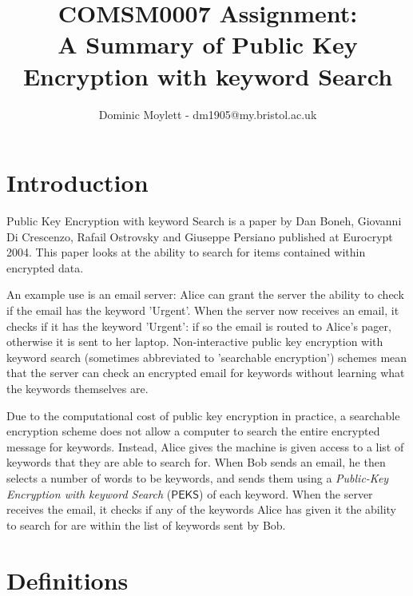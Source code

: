 \documentclass[a4paper,11pt]{article}
\title{COMSM0007 Assignment:\\A Summary of Public Key Encryption with keyword Search}
\author{Dominic Moylett - dm1905@my.bristol.ac.uk}
\begin{document}
    \maketitle

    \section{Introduction}

    Public Key Encryption with keyword Search\cite{cryptoeprint:2003:195} is a paper by Dan Boneh, Giovanni Di Crescenzo, Rafail Ostrovsky and Giuseppe Persiano published at Eurocrypt 2004. This paper looks at the ability to search for items contained within encrypted data.

    An example use is an email server: Alice can grant the server the ability to check if the email has the keyword 'Urgent'. When the server now receives an email, it checks if it has the keyword 'Urgent': if so the email is routed to Alice's pager, otherwise it is sent to her laptop. Non-interactive public key encryption with keyword search (sometimes abbreviated to 'searchable encryption') schemes mean that the server can check an encrypted email for keywords without learning what the keywords themselves are.

    Due to the computational cost of public key encryption in practice, a searchable encryption scheme does not allow a computer to search the entire encrypted message for keywords. Instead, Alice gives the machine is given access to a list of keywords that they are able to search for. When Bob sends an email, he then selects a number of words to be keywords, and sends them using a \textit{Public-Key Encryption with keyword Search} ($\mathsf{PEKS}$) of each keyword. When the server receives the email, it checks if any of the keywords Alice has given it the ability to search for are within the list of keywords sent by Bob.

    \section{Definitions}
\end{document}
